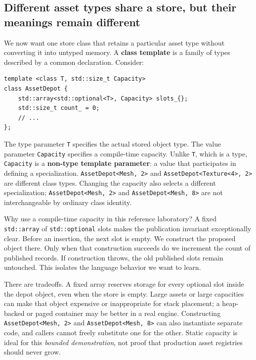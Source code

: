 \subsection{Different asset types share a store, but their meanings remain different}\label{01-foundations-i-ch005-different-asset-types-share-a-store-but-their-meanings-remain-different}

We now want one store class that retains a particular asset type without converting it into untyped memory. A \textbf{class template} is a family of types described by a common declaration. Consider:

\begin{verbatim}
template <class T, std::size_t Capacity>
class AssetDepot {
    std::array<std::optional<T>, Capacity> slots_{};
    std::size_t count_ = 0;
    // ...
};
\end{verbatim}

The type parameter \texttt{T} specifies the actual stored object type. The value parameter \texttt{Capacity} specifies a compile-time capacity. Unlike \texttt{T}, which is a type, \texttt{Capacity} is a \textbf{non-type template parameter}: a value that participates in defining a specialization. \texttt{AssetDepot\textless{}Mesh,\ 2\textgreater{}} and \texttt{AssetDepot\textless{}Texture\textless{}4\textgreater{},\ 2\textgreater{}} are different class types. Changing the capacity also selects a different specialization; \texttt{AssetDepot\textless{}Mesh,\ 2\textgreater{}} and \texttt{AssetDepot\textless{}Mesh,\ 8\textgreater{}} are not interchangeable by ordinary class identity.

Why use a compile-time capacity in this reference laboratory? A fixed \texttt{std::array} of \texttt{std::optional} slots makes the publication invariant exceptionally clear. Before an insertion, the next slot is empty. We construct the proposed object there. Only when that construction succeeds do we increment the count of published records. If construction throws, the old published slots remain untouched. This isolates the language behavior we want to learn.

There are tradeoffs. A fixed array reserves storage for every optional slot inside the depot object, even when the store is empty. Large assets or large capacities can make that object expensive or inappropriate for stack placement; a heap-backed or paged container may be better in a real engine. Constructing \texttt{AssetDepot\textless{}Mesh,\ 2\textgreater{}} and \texttt{AssetDepot\textless{}Mesh,\ 8\textgreater{}} can also instantiate separate code, and callers cannot freely substitute one for the other. Static capacity is ideal for this \emph{bounded demonstration}, not proof that production asset registries should never grow.

